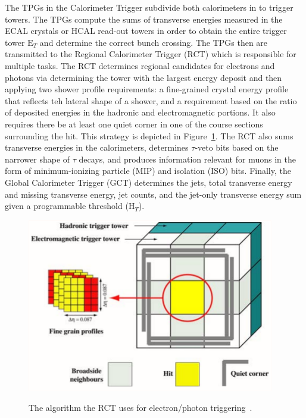 The TPGs in the Calorimeter Trigger subdivide both calorimeters in to trigger towers.  The TPGs compute the sums of transverse energies measured in the ECAL crystals or HCAL read-out towers in order to obtain the entire trigger tower $\text{E}_T$  and determine the correct bunch crossing.  The TPGs then are transmitted to the Regional Calorimeter Trigger (RCT) which is responsible for multiple tasks.  The RCT determines regional candidates for electrons and photons via determining the tower with the largest energy deposit and then applying two shower profile requirements: a fine-grained crystal energy profile that reflects teh lateral shape of a shower, and a requirement based on the ratio of deposited energies in the hadronic and electromagnetic portions.  It also requires there be at least one quiet corner in one of the course sections surrounding the hit.  This strategy is depicted in Figure~\ref{figapp:CALtrigger}.  The RCT also sums transverse energies in the calorimeters, determines $\tau$-veto bits based on the narrower shape of $\tau$ decays, and produces information relevant for muons in the form of minimum-ionizing particle (MIP) and isolation (ISO) bits.  Finally, the Global Calorimeter Trigger (GCT) determines the jets, total transverse energy and missing transverse energy, jet counts, and the jet-only transverse energy sum given a programmable threshold ($\text{H}_T$).  

\begin{figure}[!Hh]
       \includegraphics[scale=0.6]{Figures/CALtrigger.png} \\
       \caption[Electron/photon trigger strategy.]{The algorithm the RCT uses for electron/photon triggering~\cite{CMSdetector}.}
\label{figapp:CALtrigger}
\end{figure}

